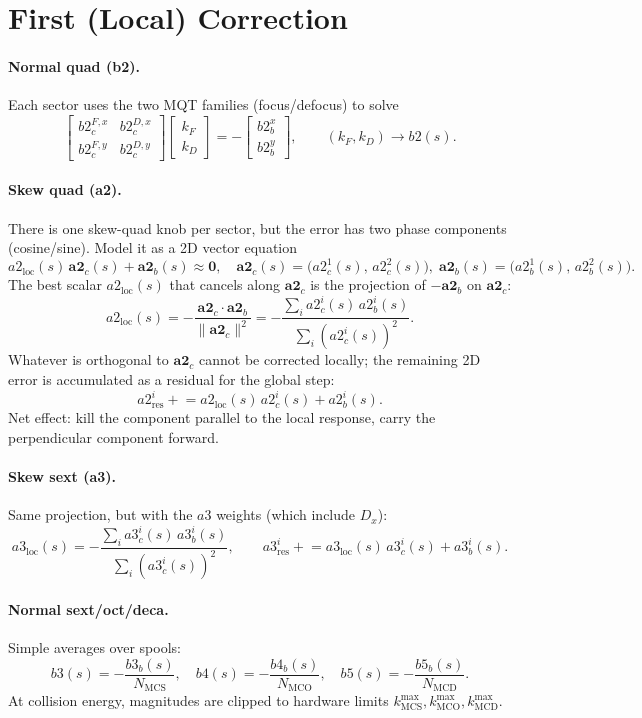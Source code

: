 \documentclass[11pt]{article}
\begin{document}
\section{First (Local) Correction}
\paragraph{Normal quad (b2).} Each sector uses the two MQT families (focus/defocus) to solve
\[
\begin{bmatrix}
b2_c^{F,x} & b2_c^{D,x}\\
b2_c^{F,y} & b2_c^{D,y}
\end{bmatrix}
\begin{bmatrix} k_F\\ k_D \end{bmatrix}
= - \begin{bmatrix} b2_b^x\\ b2_b^y \end{bmatrix},\qquad
(k_F,k_D)\to b2(s).
\]
\paragraph{Skew quad (a2).} There is one skew-quad knob per sector, but the error has two phase components (cosine/sine). Model it as a 2D vector equation
\[
a2_{\mathrm{loc}}(s)\, \mathbf{a2}_c(s) + \mathbf{a2}_b(s) \approx \mathbf{0},
\quad
\mathbf{a2}_c(s)=\bigl(a2_c^1(s),\,a2_c^2(s)\bigr),\;
\mathbf{a2}_b(s)=\bigl(a2_b^1(s),\,a2_b^2(s)\bigr).
\]
The best scalar $a2_{\mathrm{loc}}(s)$ that cancels along $\mathbf{a2}_c$ is the projection of $-\mathbf{a2}_b$ on $\mathbf{a2}_c$:
\[
a2_{\mathrm{loc}}(s) = -\frac{\mathbf{a2}_c\cdot\mathbf{a2}_b}{\|\mathbf{a2}_c\|^2}
= -\frac{\sum_i a2_c^i(s)\,a2_b^i(s)}{\sum_i (a2_c^i(s))^2}.
\]
Whatever is orthogonal to $\mathbf{a2}_c$ cannot be corrected locally; the remaining 2D error is accumulated as a residual for the global step:
\[
a2_{\mathrm{res}}^i \mathrel{+}= a2_{\mathrm{loc}}(s)\,a2_c^i(s)+a2_b^i(s).
\]
Net effect: kill the component parallel to the local response, carry the perpendicular component forward.
\paragraph{Skew sext (a3).} Same projection, but with the $a3$ weights (which include $D_x$):
\[
a3_{\mathrm{loc}}(s) = -\frac{\sum_i a3_c^i(s)\,a3_b^i(s)}{\sum_i (a3_c^i(s))^2},\qquad
a3_{\mathrm{res}}^i \mathrel{+}= a3_{\mathrm{loc}}(s)\,a3_c^i(s)+a3_b^i(s).
\]
\paragraph{Normal sext/oct/deca.} Simple averages over spools:
\[
b3(s)=-\frac{b3_b(s)}{N_{\mathrm{MCS}}},\quad
b4(s)=-\frac{b4_b(s)}{N_{\mathrm{MCO}}},\quad
b5(s)=-\frac{b5_b(s)}{N_{\mathrm{MCD}}}.
\]
At collision energy, magnitudes are clipped to hardware limits $k^{\max}_{\mathrm{MCS}},k^{\max}_{\mathrm{MCO}},k^{\max}_{\mathrm{MCD}}$.
\end{document}

